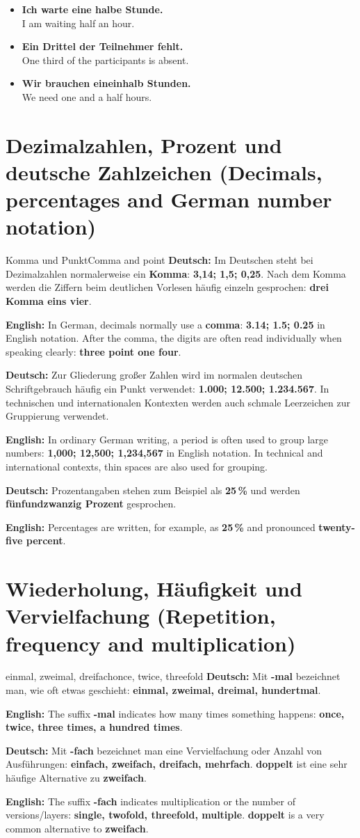 \documentclass[a4paper,11pt]{article}
\newcommand{\GermanText}[1]{\textbf{Deutsch: }#1\par}
\newcommand{\EnglishText}[1]{{\small\color{SoftGray}\textbf{English: }#1\par}}
\newcommand{\ExampleItem}[2]{\item \textbf{#1}\\{\small\color{SoftGray}#2}}
\begin{document}
\begin{exbox}
\begin{itemize}
\ExampleItem{Ich warte eine halbe Stunde.}{I am waiting half an hour.}
\ExampleItem{Ein Drittel der Teilnehmer fehlt.}{One third of the participants is absent.}
\ExampleItem{Wir brauchen eineinhalb Stunden.}{We need one and a half hours.}
\end{itemize}
\end{exbox}

\section{Dezimalzahlen, Prozent und deutsche Zahlzeichen \textnormal{(Decimals, percentages and German number notation)}}
\begin{grammarentry}{Komma und Punkt}{Comma and point}
\GermanText{Im Deutschen steht bei Dezimalzahlen normalerweise ein \textbf{Komma}: \textbf{3,14; 1,5; 0,25}. Nach dem Komma werden die Ziffern beim deutlichen Vorlesen häufig einzeln gesprochen: \textbf{drei Komma eins vier}.}
\EnglishText{In German, decimals normally use a \textbf{comma}: \textbf{3.14; 1.5; 0.25} in English notation. After the comma, the digits are often read individually when speaking clearly: \textbf{three point one four}.}
\GermanText{Zur Gliederung großer Zahlen wird im normalen deutschen Schriftgebrauch häufig ein Punkt verwendet: \textbf{1.000; 12.500; 1.234.567}. In technischen und internationalen Kontexten werden auch schmale Leerzeichen zur Gruppierung verwendet.}
\EnglishText{In ordinary German writing, a period is often used to group large numbers: \textbf{1,000; 12,500; 1,234,567} in English notation. In technical and international contexts, thin spaces are also used for grouping.}
\GermanText{Prozentangaben stehen zum Beispiel als \textbf{25\,\%} und werden \textbf{fünfundzwanzig Prozent} gesprochen.}
\EnglishText{Percentages are written, for example, as \textbf{25\,\%} and pronounced \textbf{twenty-five percent}.}
\end{grammarentry}

\section{Wiederholung, Häufigkeit und Vervielfachung \textnormal{(Repetition, frequency and multiplication)}}
\begin{grammarentry}{einmal, zweimal, dreifach}{once, twice, threefold}
\GermanText{Mit \textbf{-mal} bezeichnet man, wie oft etwas geschieht: \textbf{einmal, zweimal, dreimal, hundertmal}.}
\EnglishText{The suffix \textbf{-mal} indicates how many times something happens: \textbf{once, twice, three times, a hundred times}.}
\GermanText{Mit \textbf{-fach} bezeichnet man eine Vervielfachung oder Anzahl von Ausführungen: \textbf{einfach, zweifach, dreifach, mehrfach}. \textbf{doppelt} ist eine sehr häufige Alternative zu \textbf{zweifach}.}
\EnglishText{The suffix \textbf{-fach} indicates multiplication or the number of versions/layers: \textbf{single, twofold, threefold, multiple}. \textbf{doppelt} is a very common alternative to \textbf{zweifach}.}
\end{grammarentry}
\end{document}
